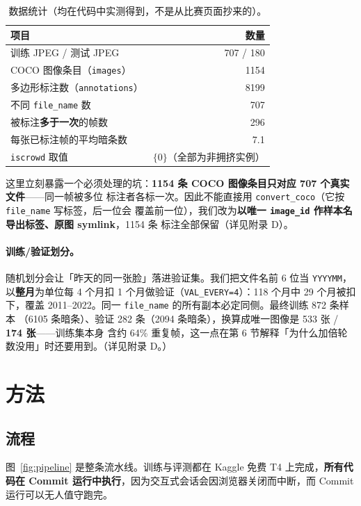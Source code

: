 \documentclass{article}
\begin{document}
\begin{table}[t]
\centering
\caption{数据统计（均在代码中实测得到，不是从比赛页面抄来的）。}
\label{tab:data}
\small
\begin{tabular}{lr}
\toprule
项目 & 数量 \\
\midrule
训练 JPEG / 测试 JPEG & 707 / 180 \\
COCO 图像条目（\texttt{images}） & 1154 \\
多边形标注数（\texttt{annotations}） & 8199 \\
不同 \texttt{file\_name} 数 & 707 \\
被标注\textbf{多于一次}的帧数 & 296 \\
每张已标注帧的平均暗条数 & 7.1 \\
\texttt{iscrowd} 取值 & $\{0\}$（全部为非拥挤实例） \\
\bottomrule
\end{tabular}
\end{table}

这里立刻暴露一个必须处理的坑：\textbf{1154 条 COCO 图像条目只对应 707 个真实文件}——同一帧被多位
标注者各标一次。因此不能直接用 \texttt{convert\_coco}（它按 \texttt{file\_name} 写标签，后一位会
覆盖前一位），我们改为\textbf{以唯一 \texttt{image\_id} 作样本名导出标签、原图 symlink}，1154 条
标注全部保留（详见附录 D）。

\paragraph{训练/验证划分。} 随机划分会让「昨天的同一张脸」落进验证集。我们把文件名前 6 位当
\texttt{YYYYMM}，以\textbf{整月}为单位每 4 个月扣 1 个月做验证（\texttt{VAL\_EVERY=4}）：118 个月中
29 个月被扣下，覆盖 2011--2022。同一 \texttt{file\_name} 的所有副本必定同侧。最终训练 872 条样本
（6105 条暗条）、验证 282 条（2094 条暗条），换算成唯一图像是 533 张 / \textbf{174 张}——训练集本身
含约 64\% 重复帧，这一点在第 6 节解释「为什么加倍轮数没用」时还要用到。（详见附录 D。）

\section{方法}
\subsection{流程}
图~\ref{fig:pipeline} 是整条流水线。训练与评测都在 Kaggle 免费 T4 上完成，\textbf{所有代码在
Commit 运行中执行}，因为交互式会话会因浏览器关闭而中断，而 Commit 运行可以无人值守跑完。
\end{document}
